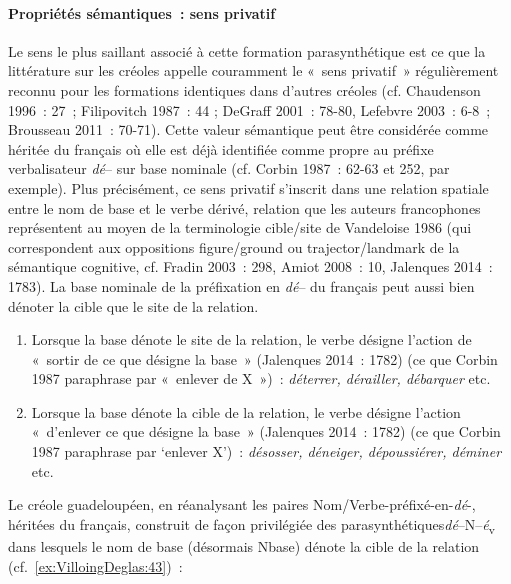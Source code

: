 \documentclass[output=paper]{langsci/langscibook}
\begin{document}
\paragraph{Propriétés sémantiques~: sens
privatif}\label{propriétés-sémantiques-sens-privatif}

Le sens le plus saillant associé à cette formation parasynthétique est
ce que la littérature sur les créoles appelle couramment le «~sens
privatif~» régulièrement reconnu pour les formations identiques dans
d'autres créoles (cf. Chaudenson 1996~: 27~; Filipovitch 1987~: 44 ;
DeGraff 2001~: 78-80, Lefebvre 2003~: 6-8~; Brousseau 2011~: 70-71).
Cette valeur sémantique peut être considérée comme héritée du français
où elle est déjà identifiée comme propre au préfixe verbalisateur
\emph{dé}-- sur base nominale (cf. Corbin 1987~: 62-63 et 252, par
exemple). Plus précisément, ce sens privatif s'inscrit dans une relation
spatiale entre le nom de base et le verbe dérivé, relation que les
auteurs francophones représentent au moyen de la terminologie cible/site
de Vandeloise 1986 (qui correspondent aux oppositions figure/ground ou
trajector/landmark de la sémantique cognitive, cf. Fradin 2003~: 298,
Amiot 2008~: 10, Jalenques 2014~: 1783). La base nominale de la
préfixation en \emph{dé}-- du français peut aussi bien dénoter la cible
que le site de la relation.

\begin{enumerate}\def\labelenumi{(\roman{enumi})}

\item
  Lorsque la base dénote le site de la relation, le verbe désigne
  l'action de «~sortir de ce que désigne la base~» (Jalenques 2014~:
  1782) (ce que Corbin 1987 paraphrase par «~enlever de X~»)~:
  \emph{déterrer, dérailler, débarquer }etc.
\item
  Lorsque la base dénote la cible de la relation, le verbe désigne
  l'action «~d'enlever ce que désigne la base~» (Jalenques 2014~: 1782)
  (ce que Corbin 1987 paraphrase par `enlever X')~: \emph{désosser,
  déneiger, dépoussiérer, déminer} etc.
\end{enumerate}

Le créole guadeloupéen, en réanalysant les paires
Nom/Verbe-préfixé-en-\emph{dé}-, héritées du français, construit de
façon privilégiée des parasynthétiques\emph{dé}--N--\emph{é}\textsubscript{v} dans
lesquels le nom de base (désormais Nbase) dénote la cible de la relation
(cf.~\ref{ex:VilloingDeglas:43})~:
\end{document}
